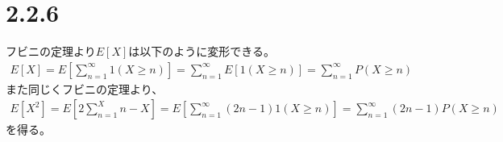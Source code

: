 \documentclass{article}
\begin{document}
\section{2.2.6}
フビニの定理より$E[X]$は以下のように変形できる。
\begin{align*}
	E\left[ X \right] = E\left[ \sum_{n = 1}^{\infty} 1(X \geq n) \right] = \sum_{n = 1}^{\infty} E[1(X \geq n)] = \sum_{n = 1}^{\infty} P(X \geq n)
\end{align*}
また同じくフビニの定理より、
\begin{align*}
	E[X^2] = E\left[ 2 \sum_{n=1}^X n - X \right] = E\left[ \sum_{n=1}^{\infty} (2n-1) 1(X \geq n) \right] = \sum_{n=1}^{\infty} (2n-1) P(X \geq n)
\end{align*}
を得る。
\end{document}
